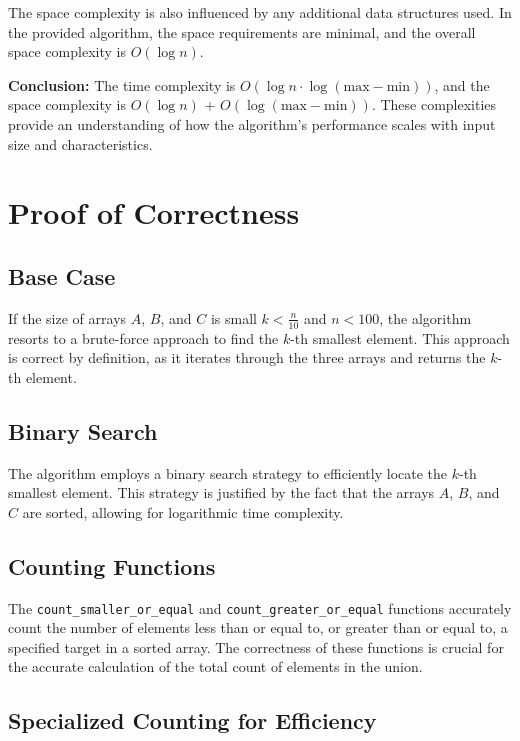 \documentclass{article}
\begin{document}
The space complexity is also influenced by any additional data structures used. In the provided algorithm, the space requirements are minimal, and the overall space complexity is \(O(\log n)\).

\textbf{Conclusion:} The time complexity is \(O(\log n \cdot \log(\text{max} - \text{min}))\), and the space complexity is \(O(\log n)\) + \(O(\log(\text{max} - \text{min}))\). These complexities provide an understanding of how the algorithm's performance scales with input size and characteristics.






\section{Proof of Correctness}

\subsection{Base Case}

If the size of arrays $A$, $B$, and $C$ is small \(k < \frac{n}{10}\) and \(n < 100\), the algorithm resorts to a brute-force approach to find the $k$-th smallest element. This approach is correct by definition, as it iterates through the three arrays and returns the $k$-th element.

\subsection{Binary Search}

The algorithm employs a binary search strategy to efficiently locate the $k$-th smallest element. This strategy is justified by the fact that the arrays $A$, $B$, and $C$ are sorted, allowing for logarithmic time complexity.

\subsection{Counting Functions}

The \texttt{count\_smaller\_or\_equal} and \texttt{count\_greater\_or\_equal} functions accurately count the number of elements less than or equal to, or greater than or equal to, a specified target in a sorted array. The correctness of these functions is crucial for the accurate calculation of the total count of elements in the union.

\subsection{Specialized Counting for Efficiency}
\end{document}
